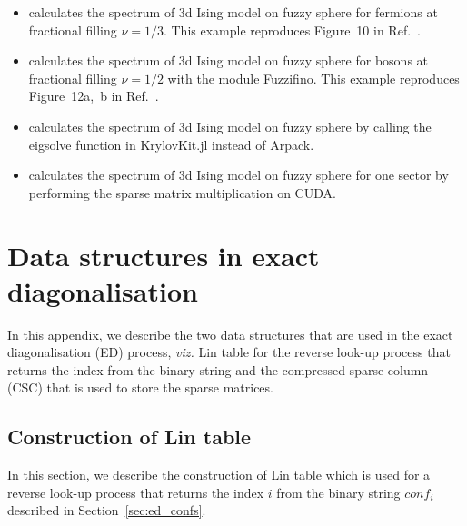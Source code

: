 \documentclass{timesjhep}
\begin{document}
\begin{itemize}
    \item {} calculates the spectrum of 3d Ising model on fuzzy sphere for fermions at fractional filling $\nu = 1/3$. This example reproduces Figure~10 in Ref.~\cite{Voinea2024}.
    \item {} calculates the spectrum of 3d Ising model on fuzzy sphere for bosons at fractional filling $\nu = 1/2$ with the module Fuzzifino. This example reproduces Figure~12a,~b in Ref.~\cite{Voinea2024}.
    \item {} calculates the spectrum of 3d Ising model on fuzzy sphere by calling the eigsolve function in KrylovKit.jl instead of Arpack.
    \item {} calculates the spectrum of 3d Ising model on fuzzy sphere for one sector by performing the sparse matrix multiplication on CUDA.
\end{itemize}



\clearpage
\appendix

\section{Data structures in exact diagonalisation}

In this appendix, we describe the two data structures that are used in the exact diagonalisation (ED) process, \textit{viz.} Lin table for the reverse look-up process that returns the index from the binary string and the compressed sparse column (CSC) that is used to store the sparse matrices. 

\subsection{Construction of Lin table}
\label{app:data_lin}

In this section, we describe the construction of Lin table which is used for a reverse look-up process that returns the index $i$ from the binary string $conf_i$ described in Section~\ref{sec:ed_confs}. 
\end{document}
